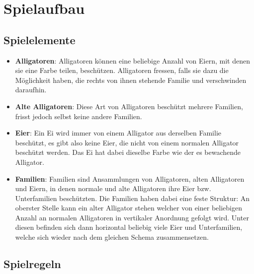 \section{Spielaufbau}

\subsection{Spielelemente}

	\begin{itemize}

	\item \textbf{Alligatoren}: Alligatoren können eine beliebige Anzahl von Eiern, mit denen sie eine Farbe teilen, beschützen.
	Alligatoren fressen, falls sie dazu die Möglichkeit haben, die rechts von ihnen stehende Familie und verschwinden daraufhin.

	\item \textbf{Alte Alligatoren}: Diese Art von Alligatoren beschützt mehrere Familien, frisst jedoch selbst keine andere Familien.

	\item \textbf{Eier}: Ein Ei wird immer von einem Alligator aus derselben Familie beschützt, es gibt also keine Eier, die nicht von einem normalen Alligator beschützt werden.
	Das Ei hat dabei dieselbe Farbe wie der es bewachende Alligator.

	\item \textbf{Familien}: Familien sind Ansammlungen von Alligatoren, alten Alligatoren und Eiern, in denen normale und alte Alligatoren ihre Eier bzw. Unterfamilien beschützten.
	Die Familien haben dabei eine feste Struktur: An oberster Stelle kann ein alter Alligator stehen welcher von einer beliebigen Anzahl an normalen Alligatoren in vertikaler Anordnung gefolgt wird.
	Unter diesen befinden sich dann horizontal beliebig viele Eier und Unterfamilien, welche sich wieder nach dem gleichen Schema zusammensetzen.

	\end{itemize}

\subsection{Spielregeln}

